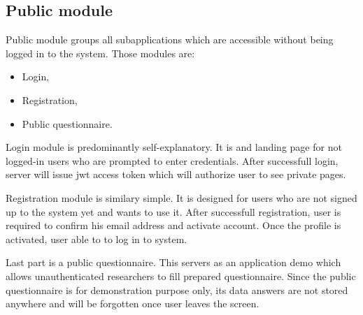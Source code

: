 \subsection{Public module}

Public module groups all subapplications which are accessible without being logged in to the system.
Those modules are:

\begin{itemize}
    \item Login,
    \item Registration,
    \item Public questionnaire.
\end{itemize}

Login module is predominantly self-explanatory.
It is and landing page for not logged-in users who are prompted to enter credentials.
After successfull login, server will issue \gls{jwt} access token which will authorize user to see private pages.

Registration module is similary simple.
It is designed for users who are not signed up to the system yet and wants to use it.
After successfull registration, user is required to confirm his email address and activate account.
Once the profile is activated, user able to to log in to system.

Last part is a public questionnaire.
This servers as an application demo which allows unauthenticated researchers to fill prepared questionnaire.
Since the public questionnaire is for demonstration purpose only, its data answers are not stored anywhere and will be forgotten once user leaves the screen.

